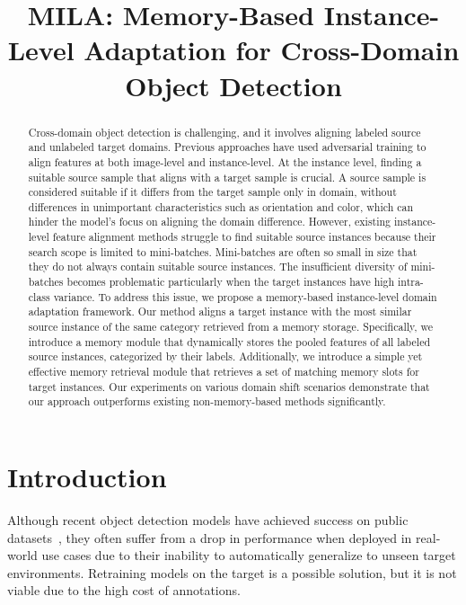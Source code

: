 \documentclass{bmvc2k}
\title{MILA: Memory-Based Instance-Level Adaptation for Cross-Domain Object Detection}
\begin{document}
\maketitle
\begin{abstract}













Cross-domain object detection is challenging, and it involves aligning labeled source and unlabeled target domains. 
Previous approaches have used adversarial training to align features at both image-level and instance-level.
At the instance level, finding a suitable source sample that aligns with a target sample is crucial. 
A source sample is considered suitable if it differs from the target sample only in domain, without differences in unimportant characteristics such as orientation and color, which can hinder the model's focus on aligning the domain difference. 
However, existing instance-level feature alignment methods struggle to find suitable source instances because their search scope is limited to mini-batches.
Mini-batches are often so small in size that they do not always contain suitable source instances.
The insufficient diversity of mini-batches becomes problematic particularly when the target instances have high intra-class variance.
To address this issue, we propose a memory-based instance-level domain adaptation framework. 
Our method aligns a target instance with the most similar source instance of the same category retrieved from a memory storage. 
Specifically, we introduce a memory module that dynamically stores the pooled features of all labeled source instances, categorized by their labels. Additionally, we introduce a simple yet effective memory retrieval module that retrieves a set of matching memory slots for target instances. 
Our experiments on various domain shift scenarios demonstrate that our approach outperforms existing non-memory-based methods significantly.







\end{abstract}


\section{Introduction}
\label{sec:intro}
Although recent object detection models have achieved success on public datasets~\cite{deng2009imagenet, lin2014microsoft, everingham2010Pascal}, they often suffer from a drop in performance when deployed in real-world use cases due to their inability to automatically generalize to unseen target environments. Retraining models on the target is a possible solution, but it is not viable due to the high cost of annotations.
\end{document}
